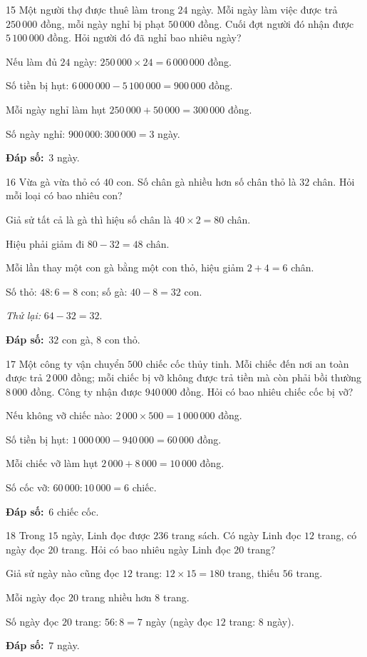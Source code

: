 \documentclass[11pt]{article}
\newif\ifsol \solfalse
\providecommand{\AnsWord}{Đáp số}
\newcommand{\dapso}[1]{\par\textbf{\AnsWord:}\ #1}
\newcommand{\probsol}[1]{%
  \begin{lrbox}{\solmeasure}\begin{minipage}{\dimexpr\linewidth-24pt\relax}#1\end{minipage}\end{lrbox}%
  \ifsol
    \begin{solbox}#1\end{solbox}%
  \else
    \setlength{\solht}{\dimexpr\ht\solmeasure+\dp\solmeasure+0.85cm\relax}%
    \ifdim\solht<1.35cm\setlength{\solht}{1.35cm}\fi
    \begin{tcolorbox}[colback=white,colframe=Line,boxrule=0.8pt,arc=5pt,
      left=8pt,right=8pt,top=4pt,bottom=4pt,height=\solht]{\footnotesize\color{Slate}\itshape\WorkWord}\end{tcolorbox}%
  \fi}
\newcommand{\gap}{\vspace{0.3cm}}
\def\WorkWord{Bài làm:}
\def\AnsWord{Đáp số}
\begin{document}
\gap
\begin{probbox}{15}{\relax}
Một người thợ được thuê làm trong $24$ ngày. Mỗi ngày làm việc được trả $250\,000$ đồng, mỗi ngày nghỉ bị phạt $50\,000$ đồng. Cuối đợt người đó nhận được $5\,100\,000$ đồng. Hỏi người đó đã nghỉ bao nhiêu ngày?
\end{probbox}
\probsol{
Nếu làm đủ $24$ ngày: $250\,000\times24=6\,000\,000$ đồng.\par
Số tiền bị hụt: $6\,000\,000-5\,100\,000=900\,000$ đồng.\par
Mỗi ngày nghỉ làm hụt $250\,000+50\,000=300\,000$ đồng.\par Số ngày nghỉ: $900\,000:300\,000=3$ ngày.
\dapso{$3$ ngày.}}
\gap
\begin{probbox}{16}{\relax}
Vừa gà vừa thỏ có $40$ con. Số chân gà nhiều hơn số chân thỏ là $32$ chân. Hỏi mỗi loại có bao nhiêu con?
\end{probbox}
\probsol{
Giả sử tất cả là gà thì hiệu số chân là $40\times2=80$ chân.\par
Hiệu phải giảm đi $80-32=48$ chân.\par Mỗi lần thay một con gà bằng một con thỏ, hiệu giảm $2+4=6$ chân.\par
Số thỏ: $48:6=8$ con; số gà: $40-8=32$ con.\par \emph{Thử lại:} $64-32=32$.
\dapso{$32$ con gà, $8$ con thỏ.}}
\gap
\begin{probbox}{17}{\relax}
Một công ty vận chuyển $500$ chiếc cốc thủy tinh. Mỗi chiếc đến nơi an toàn được trả $2\,000$ đồng; mỗi chiếc bị vỡ không được trả tiền mà còn phải bồi thường $8\,000$ đồng. Công ty nhận được $940\,000$ đồng. Hỏi có bao nhiêu chiếc cốc bị vỡ?
\end{probbox}
\probsol{
Nếu không vỡ chiếc nào: $2\,000\times500=1\,000\,000$ đồng.\par
Số tiền bị hụt: $1\,000\,000-940\,000=60\,000$ đồng.\par
Mỗi chiếc vỡ làm hụt $2\,000+8\,000=10\,000$ đồng.\par Số cốc vỡ: $60\,000:10\,000=6$ chiếc.
\dapso{$6$ chiếc cốc.}}
\gap
\begin{probbox}{18}{\relax}
Trong $15$ ngày, Linh đọc được $236$ trang sách. Có ngày Linh đọc $12$ trang, có ngày đọc $20$ trang. Hỏi có bao nhiêu ngày Linh đọc $20$ trang?
\end{probbox}
\probsol{
Giả sử ngày nào cũng đọc $12$ trang: $12\times15=180$ trang, thiếu $56$ trang.\par
Mỗi ngày đọc $20$ trang nhiều hơn $8$ trang.\par Số ngày đọc $20$ trang: $56:8=7$ ngày (ngày đọc $12$ trang: $8$ ngày).
\dapso{$7$ ngày.}}
\end{document}
